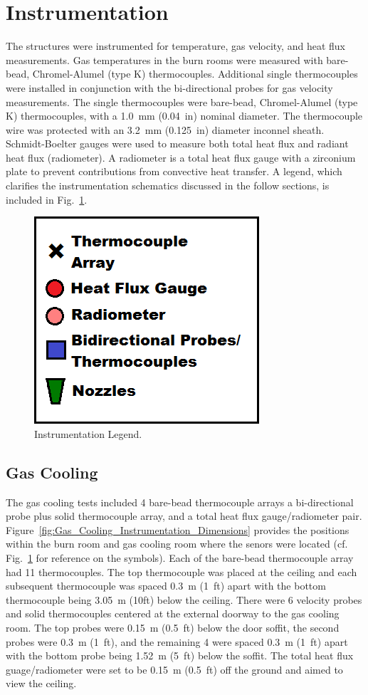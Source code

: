 \documentclass[12pt,oneside]{book}
\begin{document}
\clearpage

\section{Instrumentation}
\label{sec:Instrumentation}

The structures were instrumented for temperature, gas velocity, and heat flux measurements. Gas temperatures in the burn rooms were measured with bare-bead, Chromel-Alumel (type K) thermocouples. Additional single thermocouples were installed in conjunction with the bi-directional probes for gas velocity measurements. The single thermocouples were bare-bead, Chromel-Alumel (type K) thermocouples, with a 1.0~mm (0.04~in) nominal diameter. The thermocouple wire was protected with an 3.2~mm (0.125~in) diameter inconnel sheath. Schmidt-Boelter gauges were used to measure both total heat flux and radiant heat flux (radiometer). A radiometer is a total heat flux gauge with a zirconium plate to prevent contributions from convective heat transfer. A legend, which clarifies the instrumentation schematics discussed in the follow sections, is included in Fig.~\ref{fig:Instrumentation_Legend}.

\begin{figure}[!ht]
	\includegraphics[width=.35\columnwidth]{../Figures/Pictures/Legend2}
	\caption{Instrumentation Legend.}
	\label{fig:Instrumentation_Legend}
\end{figure}

\subsection{Gas Cooling}
\label{subsec:Gas_Cooling_Instrumentation}

The gas cooling tests included 4 bare-bead thermocouple arrays  a bi-directional probe plus solid thermocouple array, and a total heat flux gauge/radiometer pair. Figure~\ref{fig:Gas_Cooling_Instrumentation_Dimensions} provides the positions within the burn room and gas cooling room where the senors were located (cf. Fig.~\ref{fig:Instrumentation_Legend} for reference on the symbols). Each of the bare-bead thermocouple array had 11 thermocouples. The top thermocouple was placed at the ceiling and each subsequent thermocouple was spaced 0.3~m (1~ft) apart with the bottom thermocouple being 3.05~m (10ft) below the ceiling. There were 6 velocity probes and solid thermocouples centered at the external doorway to the gas cooling room. The top probes were 0.15~m (0.5~ft) below the door soffit, the second probes were 0.3~m (1~ft), and the remaining 4 were spaced 0.3~m (1~ft) apart with the bottom probe being 1.52~m (5~ft) below the soffit. The total heat flux guage/radiometer were set to be 0.15~m (0.5~ft) off the ground and aimed to view the ceiling.
\end{document}
